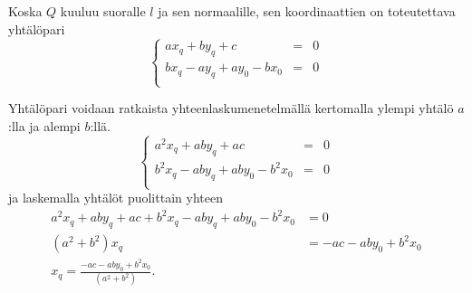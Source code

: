 Koska $Q$ kuuluu suoralle $l$ ja sen normaalille, sen koordinaattien on toteutettava yhtälöpari
\[
\left\{    
    \begin{array}{rcl}
        ax_q + by_q + c &=&0 \\
        bx_q-ay_q+ay_0-bx_0 &=& 0 \\
    \end{array}
    \right.
\]

Yhtälöpari voidaan ratkaista yhteenlaskumenetelmällä kertomalla ylempi yhtälö $a$:lla ja alempi $b$:llä.
\[
\left\{    
    \begin{array}{rcl}
        a^2x_q + aby_q + ac &=&0 \\
        b^2x_q-aby_q+aby_0-b^2x_0 &=& 0 \\
    \end{array}
    \right.
\]
ja laskemalla yhtälöt puolittain yhteen
\begin{align*}
 a^2x_q + aby_q + ac + b^2x_q-aby_q+aby_0-b^2x_0 &= 0 \\
 (a^2+b^2)x_q &= -ac-aby_0+b^2x_0 \\
 x_q = \frac{-ac-aby_0+b^2x_0}{(a^2+b^2)}.
\end{align*}


